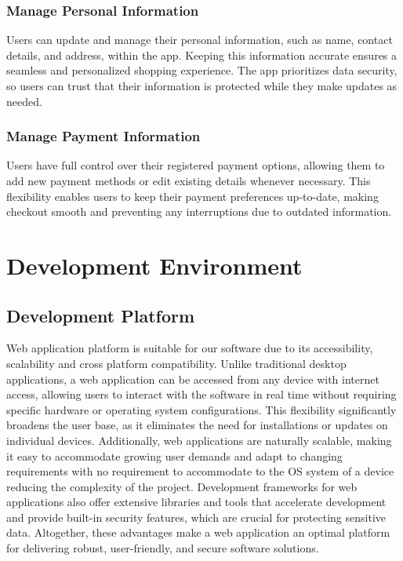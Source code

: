 \documentclass[conference]{IEEEtran}
\begin{document}
\subsubsection{Manage Personal Information}
Users can update and manage their personal information, such as name, contact details, and address, within the app. Keeping this information accurate ensures a seamless and personalized shopping experience. The app prioritizes data security, so users can trust that their information is protected while they make updates as needed. 
\subsubsection{Manage Payment Information}
Users have full control over their registered payment options, allowing them to add new payment methods or edit existing details whenever necessary. This flexibility enables users to keep their payment preferences up-to-date, making checkout smooth and preventing any interruptions due to outdated information. 


\section{Development Environment}
\subsection{Development Platform}
Web application platform is suitable for our software due to its accessibility, scalability and cross platform compatibility. Unlike traditional desktop applications, a web application can be accessed from any device with internet access, allowing users to interact with the software in real time without requiring specific hardware or operating system configurations. This flexibility significantly broadens the user base, as it eliminates the need for installations or updates on individual devices. Additionally, web applications are naturally scalable, making it easy to accommodate growing user demands and adapt to changing requirements with no requirement to accommodate to the OS system of a device reducing the complexity of the project. Development frameworks for web applications also offer extensive libraries and tools that accelerate development and provide built-in security features, which are crucial for protecting sensitive data. Altogether, these advantages make a web application an optimal platform for delivering robust, user-friendly, and secure software solutions.  
\end{document}

